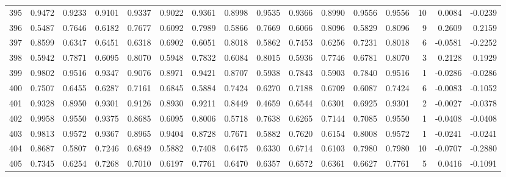 \begin{tabular}{lrrrrrrrrrrrrrrr}
395 &      0.9472 &  0.9233 &  0.9101 &  0.9337 &  0.9022 &  0.9361 &  0.8998 &  0.9535 &  0.9366 &  0.8990 &   0.9556 &     0.9556 &     10 &                    0.0084 &                    -0.0239 \\
396 &      0.5487 &  0.7646 &  0.6182 &  0.7677 &  0.6092 &  0.7989 &  0.5866 &  0.7669 &  0.6066 &  0.8096 &   0.5829 &     0.8096 &      9 &                    0.2609 &                     0.2159 \\
397 &      0.8599 &  0.6347 &  0.6451 &  0.6318 &  0.6902 &  0.6051 &  0.8018 &  0.5862 &  0.7453 &  0.6256 &   0.7231 &     0.8018 &      6 &                   -0.0581 &                    -0.2252 \\
398 &      0.5942 &  0.7871 &  0.6095 &  0.8070 &  0.5948 &  0.7832 &  0.6084 &  0.8015 &  0.5936 &  0.7746 &   0.6781 &     0.8070 &      3 &                    0.2128 &                     0.1929 \\
399 &      0.9802 &  0.9516 &  0.9347 &  0.9076 &  0.8971 &  0.9421 &  0.8707 &  0.5938 &  0.7843 &  0.5903 &   0.7840 &     0.9516 &      1 &                   -0.0286 &                    -0.0286 \\
400 &      0.7507 &  0.6455 &  0.6287 &  0.7161 &  0.6845 &  0.5884 &  0.7424 &  0.6270 &  0.7188 &  0.6709 &   0.6087 &     0.7424 &      6 &                   -0.0083 &                    -0.1052 \\
401 &      0.9328 &  0.8950 &  0.9301 &  0.9126 &  0.8930 &  0.9211 &  0.8449 &  0.4659 &  0.6544 &  0.6301 &   0.6925 &     0.9301 &      2 &                   -0.0027 &                    -0.0378 \\
402 &      0.9958 &  0.9550 &  0.9375 &  0.8685 &  0.6095 &  0.8006 &  0.5718 &  0.7638 &  0.6265 &  0.7144 &   0.7085 &     0.9550 &      1 &                   -0.0408 &                    -0.0408 \\
403 &      0.9813 &  0.9572 &  0.9367 &  0.8965 &  0.9404 &  0.8728 &  0.7671 &  0.5882 &  0.7620 &  0.6154 &   0.8008 &     0.9572 &      1 &                   -0.0241 &                    -0.0241 \\
404 &      0.8687 &  0.5807 &  0.7246 &  0.6849 &  0.5882 &  0.7408 &  0.6475 &  0.6330 &  0.6714 &  0.6103 &   0.7980 &     0.7980 &     10 &                   -0.0707 &                    -0.2880 \\
405 &      0.7345 &  0.6254 &  0.7268 &  0.7010 &  0.6197 &  0.7761 &  0.6470 &  0.6357 &  0.6572 &  0.6361 &   0.6627 &     0.7761 &      5 &                    0.0416 &                    -0.1091 \\

\end{tabular}
